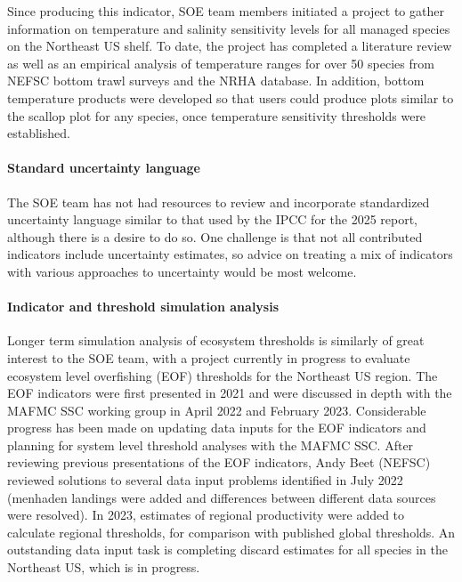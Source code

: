 \documentclass[
  10pt,
]{article}
\begin{document}
Since producing this indicator, SOE team members initiated a project to
gather information on temperature and salinity sensitivity levels for
all managed species on the Northeast US shelf. To date, the project has
completed a literature review as well as an empirical analysis of
temperature ranges for over 50 species from NEFSC bottom trawl surveys
and the NRHA database. In addition, bottom temperature products were
developed so that users could produce plots similar to the scallop plot
for any species, once temperature sensitivity thresholds were
established.

\hypertarget{standard-uncertainty-language}{%
\paragraph{Standard uncertainty
language}\label{standard-uncertainty-language}}

The SOE team has not had resources to review and incorporate
standardized uncertainty language similar to that used by the IPCC for
the 2025 report, although there is a desire to do so. One challenge is
that not all contributed indicators include uncertainty estimates, so
advice on treating a mix of indicators with various approaches to
uncertainty would be most welcome.

\hypertarget{indicator-and-threshold-simulation-analysis}{%
\paragraph{Indicator and threshold simulation
analysis}\label{indicator-and-threshold-simulation-analysis}}

Longer term simulation analysis of ecosystem thresholds is similarly of
great interest to the SOE team, with a project currently in progress to
evaluate ecosystem level overfishing (EOF) thresholds for the Northeast
US region. The EOF indicators were first presented in 2021 and were
discussed in depth with the MAFMC SSC working group in April 2022 and
February 2023. Considerable progress has been made on updating data
inputs for the EOF indicators and planning for system level threshold
analyses with the MAFMC SSC. After reviewing previous presentations of
the EOF indicators, Andy Beet (NEFSC) reviewed solutions to several data
input problems identified in July 2022 (menhaden landings were added and
differences between different data sources were resolved). In 2023,
estimates of regional productivity were added to calculate regional
thresholds, for comparison with published global thresholds. An
outstanding data input task is completing discard estimates for all
species in the Northeast US, which is in progress.
\end{document}
